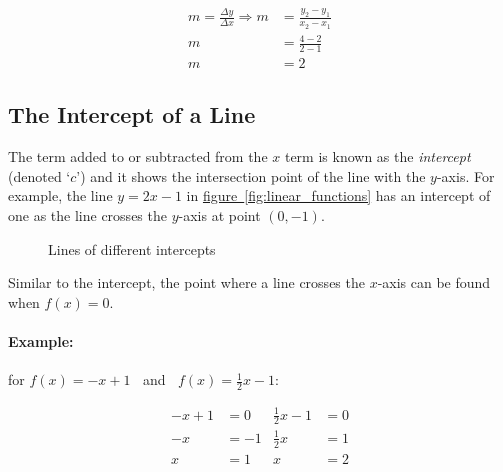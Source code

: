\documentclass[a5paper,9pt]{book}
\theoremstyle{definition}
\newcommand{\Rarr}{\Rightarrow}
\newcommand{\D}{\Delta}
\newcommand{\fig}[2]{%
    \hyperref[#2]{#1~\ref*{#2}}%
}
\begin{document}
        \begin{align*}
            m = \frac{\D y}{\D x} \Rarr m &= \frac{y_2-y_1}{x_2-x_1} \\[5pt]
            m &= \frac{4-2}{2-1} \\[5pt]
            m &= 2
        \end{align*}

        \subsection{The Intercept of a Line}

        The term added to or subtracted from the $x$ term is known as the \emph{intercept}
        (denoted `$c$') and it shows the intersection point of the line with the $y$-axis.
        For example, the line $y=2x-1$ in \fig{figure}{fig:linear_functions} has an intercept
        of one as the line crosses the $y$-axis at point $(0,-1)$.

        \pagebreak

        \begin{figure}[ht]
            \centering
                \begin{subfigure}{0.45\textwidth}
                    \centering
                    
                    \caption{}\label{fig:lines_of_different_intercepts_a}
                \end{subfigure}
                \hspace{20pt}
                \begin{subfigure}{0.45\textwidth}
                    \centering
                    
                    \caption{}\label{fig:lines_of_different_intercepts_b}
                \end{subfigure}
            \caption{Lines of different intercepts}\label{fig:lines_of_different_intercepts}
        \end{figure}

        Similar to the intercept, the point where a line crosses the $x$-axis can be
        found when $f(x)=0$.

        \paragraph{Example:} for $f(x)=-x+1\;\;$ and $\;\;f(x)=\frac{1}{2}x-1$:

        \begin{align*}
            -x+1 &= 0 & \frac{1}{2}x-1 &= 0 \\
            -x &= -1 & \frac{1}{2}x &= 1 \\
            x &= 1 & x &= 2
        \end{align*}
\end{document}
